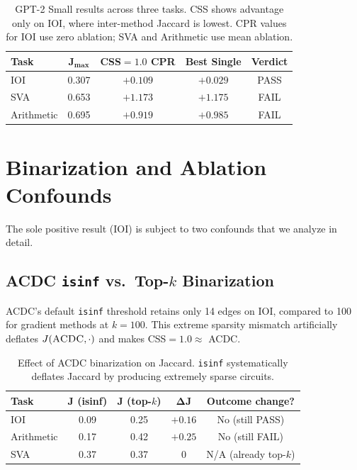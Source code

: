 \documentclass[11pt,a4paper]{article}
\newcommand{\css}{\textsc{CSS}}
\newcommand{\acdc}{\textsc{ACDC}}
\begin{document}
\begin{table}[t]
\centering
\small
\begin{tabular}{lcccc}
\toprule
\textbf{Task} & $\boldsymbol{J_{\max}}$ & \textbf{\css{}$=1.0$ CPR} & \textbf{Best Single} & \textbf{Verdict} \\
\midrule
IOI        & 0.307 & $+0.109$ & $+0.029$ & PASS \\
SVA        & 0.653 & $+1.173$ & $+1.175$ & FAIL \\
Arithmetic & 0.695 & $+0.919$ & $+0.985$ & FAIL \\
\bottomrule
\end{tabular}
\caption{GPT-2 Small results across three tasks. \css{} shows advantage only on IOI, where inter-method Jaccard is lowest. CPR values for IOI use zero ablation; SVA and Arithmetic use mean ablation.}
\label{tab:gpt2_summary}
\end{table}

\section{Binarization and Ablation Confounds}
\label{sec:binarization}

The sole positive result (IOI) is subject to two confounds that we analyze in detail.

\subsection{\acdc{} \texttt{isinf} vs.\ Top-$k$ Binarization}

\acdc{}'s default \texttt{isinf} threshold retains only 14 edges on IOI, compared to 100 for gradient methods at $k = 100$.
This extreme sparsity mismatch artificially deflates $J(\text{\acdc{}}, \cdot)$ and makes \css{}$= 1.0 \approx$ \acdc{}.

\begin{table}[t]
\centering
\small
\begin{tabular}{lcccc}
\toprule
\textbf{Task} & $\boldsymbol{J}$ \textbf{(isinf)} & $\boldsymbol{J}$ \textbf{(top-$k$)} & $\boldsymbol{\Delta J}$ & \textbf{Outcome change?} \\
\midrule
IOI        & 0.09 & 0.25 & $+0.16$ & No (still PASS) \\
Arithmetic & 0.17 & 0.42 & $+0.25$ & No (still FAIL) \\
SVA        & 0.37 & 0.37 & $0$ & N/A (already top-$k$) \\
\bottomrule
\end{tabular}
\caption{Effect of \acdc{} binarization on Jaccard. \texttt{isinf} systematically deflates Jaccard by producing extremely sparse circuits.}
\label{tab:acdc_binarization}
\end{table}
\end{document}
